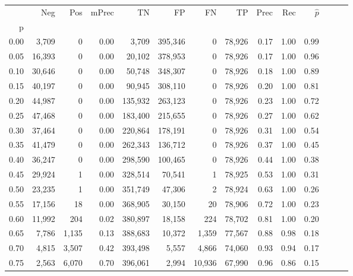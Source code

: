 \begin{tabular}{rrrrrrrrrrrrrr}
\toprule
{} &     Neg &     Pos & mPrec &       TN &       FP &      FN &      TP &  Prec &   Rec & $\hat{p}$ \\
p    &         &         &       &          &          &         &         &       &       &           \\
\midrule
0.00 &   3,709 &       0 &  0.00 &    3,709 &  395,346 &       0 &  78,926 &  0.17 &  1.00 &      0.99 \\
0.05 &  16,393 &       0 &  0.00 &   20,102 &  378,953 &       0 &  78,926 &  0.17 &  1.00 &      0.96 \\
0.10 &  30,646 &       0 &  0.00 &   50,748 &  348,307 &       0 &  78,926 &  0.18 &  1.00 &      0.89 \\
0.15 &  40,197 &       0 &  0.00 &   90,945 &  308,110 &       0 &  78,926 &  0.20 &  1.00 &      0.81 \\
0.20 &  44,987 &       0 &  0.00 &  135,932 &  263,123 &       0 &  78,926 &  0.23 &  1.00 &      0.72 \\
0.25 &  47,468 &       0 &  0.00 &  183,400 &  215,655 &       0 &  78,926 &  0.27 &  1.00 &      0.62 \\
0.30 &  37,464 &       0 &  0.00 &  220,864 &  178,191 &       0 &  78,926 &  0.31 &  1.00 &      0.54 \\
0.35 &  41,479 &       0 &  0.00 &  262,343 &  136,712 &       0 &  78,926 &  0.37 &  1.00 &      0.45 \\
0.40 &  36,247 &       0 &  0.00 &  298,590 &  100,465 &       0 &  78,926 &  0.44 &  1.00 &      0.38 \\
0.45 &  29,924 &       1 &  0.00 &  328,514 &   70,541 &       1 &  78,925 &  0.53 &  1.00 &      0.31 \\
0.50 &  23,235 &       1 &  0.00 &  351,749 &   47,306 &       2 &  78,924 &  0.63 &  1.00 &      0.26 \\
0.55 &  17,156 &      18 &  0.00 &  368,905 &   30,150 &      20 &  78,906 &  0.72 &  1.00 &      0.23 \\
0.60 &  11,992 &     204 &  0.02 &  380,897 &   18,158 &     224 &  78,702 &  0.81 &  1.00 &      0.20 \\
0.65 &   7,786 &   1,135 &  0.13 &  388,683 &   10,372 &   1,359 &  77,567 &  0.88 &  0.98 &      0.18 \\
0.70 &   4,815 &   3,507 &  0.42 &  393,498 &    5,557 &   4,866 &  74,060 &  0.93 &  0.94 &      0.17 \\
0.75 &   2,563 &   6,070 &  0.70 &  396,061 &    2,994 &  10,936 &  67,990 &  0.96 &  0.86 &      0.15 \\

\end{tabular}

